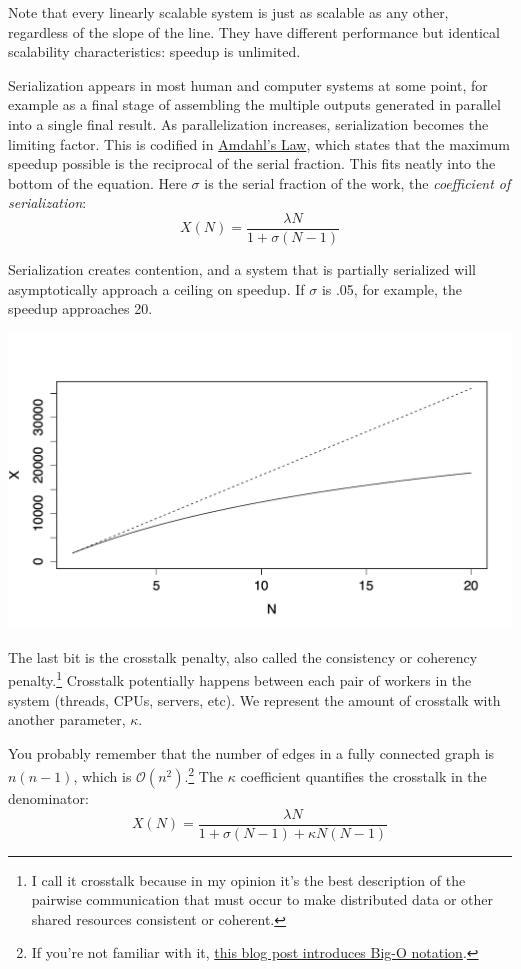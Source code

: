 \documentclass{vivid_layout}
\begin{document}
Note that every linearly scalable system is just as scalable as any other,
regardless of the slope of the line. They have different performance but
identical scalability characteristics: speedup is unlimited. 

Serialization appears in most human and computer systems at some point, for
example as a final stage of assembling the multiple outputs generated in
parallel into a single final result. As parallelization increases, serialization
becomes the limiting factor. This is codified in
\href{https://en.wikipedia.org/wiki/Amdahl\%27s\_law}{Amdahl's Law}, which states that
the maximum speedup possible is the reciprocal of the serial fraction. This fits
neatly into the bottom of the equation. Here $\sigma$ is the serial fraction of
the work, the {\itshape coefficient of serialization}:
\[
X(N) = \frac{\lambda N}{1 + \sigma(N-1)}
\]

Serialization creates contention, and a system that is partially serialized will
asymptotically approach a ceiling on speedup. If $\sigma$ is .05, for example,
the speedup approaches 20.
\begin{center}
\includegraphics[width=.85\linewidth]{scalability/amdahl}
\end{center}

The last bit is the crosstalk penalty, also called the consistency or coherency
penalty.\footnote{I call it crosstalk because in my opinion it's the best
description of the pairwise communication that must occur to make distributed
data or other shared resources consistent or coherent.} Crosstalk potentially
happens between each pair of workers in the system (threads, CPUs, servers,
etc). We represent the amount of crosstalk with another parameter, $\kappa$.

You probably remember that the number of edges in a fully connected graph is
$n(n-1)$, which is $\mathcal{O}(n^2)$.\footnote{If you're
not familiar with it,
\href{https://www.vividcortex.com/blog/2013/10/23/big-o-notation-made-simple/}{this
blog post introduces Big-O notation}.} The $\kappa$ coefficient quantifies the
crosstalk in the denominator:
\[
X(N) = \frac{\lambda N}{1 + \sigma(N-1) + \kappa N(N-1)}
\]
\end{document}
